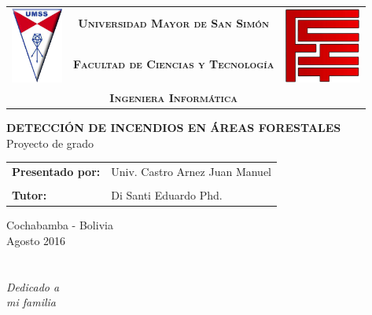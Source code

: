 \documentclass[letterpaper,openright,12pt]{book}
\begin{document}
\setlength{\unitlength}{1 cm} %
\thispagestyle{empty}
\begin{center}
    \begin{tabular}{lcl}
      \multirow{4}{*}{\includegraphics[height=2.5cm]{imagenes/umss.png}} &
      \textsc{\textbf{\Large Universidad Mayor de San Simón}} &
      \multirow{4}{*}{\includegraphics[height=2.5cm]{imagenes/fcyt.jpg}}\\
      & & \\
      &\textsc{\textbf{\Large Facultad de Ciencias y Tecnología}}&\\
      & & \\
      &\textsc{\textbf{\Large Ingeniera Informática}}&
   \end{tabular}

\vspace{3.5cm}

\textbf{{\LARGE DETECCIÓN DE INCENDIOS EN ÁREAS FORESTALES}}\\[0.5cm]
{\Large Proyecto de grado}\\[2.5cm]

\begin{tabular*}{\textwidth}{p{}p{}}
    \textbf{Presentado por:} & Univ. Castro Arnez Juan Manuel\\
    &\\
    \textbf{Tutor:} & Di Santi Eduardo Phd.\\
  \end{tabular*}

\vspace{3.5cm}
  
Cochabamba - Bolivia \\[1cm]
Agosto 2016
\end{center}

\newpage
\pagestyle{empty} %

\chapter*{}
\begin{flushright}
\textit{Dedicado a \\
mi familia}
\end{flushright}
\end{document}
